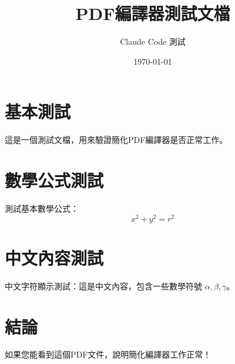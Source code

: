 \documentclass[12pt]{article}
\title{PDF編譯器測試文檔}
\author{Claude Code 測試}
\date{\today}
\begin{document}
\maketitle

\section{基本測試}

這是一個測試文檔，用來驗證簡化PDF編譯器是否正常工作。

\section{數學公式測試}

測試基本數學公式：
\begin{equation}
x^2 + y^2 = r^2
\end{equation}

\section{中文內容測試}

中文字符顯示測試：這是中文內容，包含一些數學符號 $\alpha, \beta, \gamma$。

\section{結論}

如果您能看到這個PDF文件，說明簡化編譯器工作正常！
\end{document}
